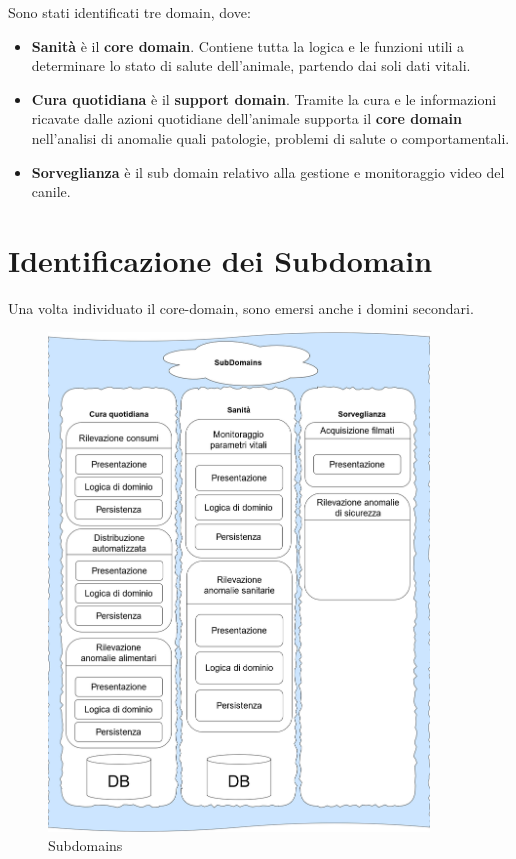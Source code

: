     Sono stati identificati tre domain, dove:
    \begin{itemize}
        \item \textbf{Sanità} è il \textbf{core domain}. Contiene tutta la logica e le funzioni utili a determinare lo stato di salute dell'animale, partendo dai soli dati vitali.
        
        \item \textbf{Cura quotidiana} è il \textbf{support domain}. Tramite la cura e le informazioni ricavate dalle azioni quotidiane dell'animale supporta il \textbf{core domain} nell'analisi di anomalie quali patologie, problemi di salute o comportamentali.
        
        \item \textbf{Sorveglianza} è il sub domain relativo alla gestione e monitoraggio video del canile.
    \end{itemize}
    
    \section{Identificazione dei Subdomain}
    Una volta individuato il core-domain, sono emersi anche i domini secondari. %
    
    \begin{figure}[ht]
        \caption{Subdomains}
        \centering
        \includegraphics[width=0.9\textwidth]{DrawIo/subDomainsView.png}
    \end{figure}
    
